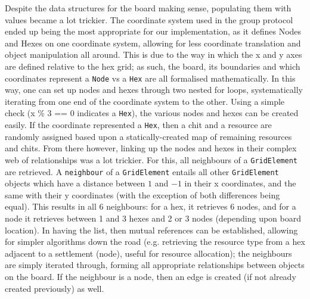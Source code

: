 \documentclass[a4paper,doc]{apa6}
\newcommand{\code}{\texttt}
\begin{document}
Despite the data structures for the board making sense, populating them with values became a lot trickier. The coordinate system used in the group protocol ended up being the most appropriate for our implementation, as it defines Nodes and Hexes on one coordinate system, allowing for less coordinate translation and object manipulation all around. This is due to the way in which the x and y axes are defined relative to the hex grid; as such, the board, its boundaries and which coordinates represent a \code{Node} vs a \code{Hex} are all formalised mathematically. In this way, one can set up nodes and hexes through two nested for loops, systematically iterating from one end of the coordinate system to the other. Using a simple check (x \% 3 == 0 indicates a \code{Hex}), the various nodes and hexes can be created easily. If the coordinate represented a \code{Hex}, then a chit and a resource are randomly assigned based upon a statically-created map of remaining resources and chits. From there however, linking up the nodes and hexes in their complex web of relationships was a lot trickier. For this, all neighbours of a \code{GridElement} are retrieved. A \code{neighbour} of a \code{GridElement} entails all other \code{GridElement} objects which have a distance between $1$ and $-1$ in their x coordinates, and the same with their y coordinates (with the exception of both differences being equal). This results in all 6 neighbours: for a hex, it retrieves 6 nodes, and for a node it retrieves between 1 and 3 hexes and 2 or 3 nodes (depending upon board location). In having the list, then mutual references can be established, allowing for simpler algorithms down the road (e.g. retrieving the resource type from a hex adjacent to a settlement (node), useful for resource allocation); the neighbours are simply iterated through, forming all appropriate relationships between objects on the board. If the neighbour is a node, then an edge is created (if not already created previously) as well.
\end{document}
